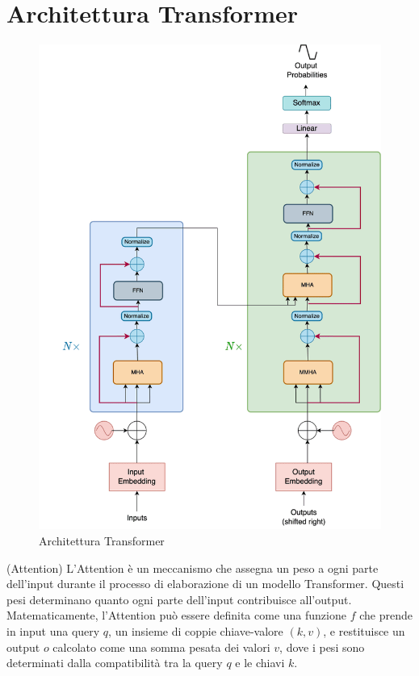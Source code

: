 \section{Architettura Transformer}

\begin{figure}[H]
    \includegraphics[width=\textwidth]{images/entire-architecture.png}
    \caption{Architettura Transformer}
\end{figure}

\begin{definition}(Attention)
    L'Attention è un meccanismo che assegna un peso a
    ogni parte dell'input durante il processo di elaborazione
    di un modello Transformer. Questi pesi determinano quanto ogni
    parte dell'input contribuisce all'output. Matematicamente,
    l'Attention può essere definita come una funzione $f$ che
    prende in input una query $q$, un insieme di coppie chiave-valore
    $(k, v)$, e restituisce un output $o$ calcolato come una somma pesata dei valori
    $v$, dove i pesi sono determinati dalla compatibilità tra la query $q$ e
    le chiavi $k$.
\end{definition}

